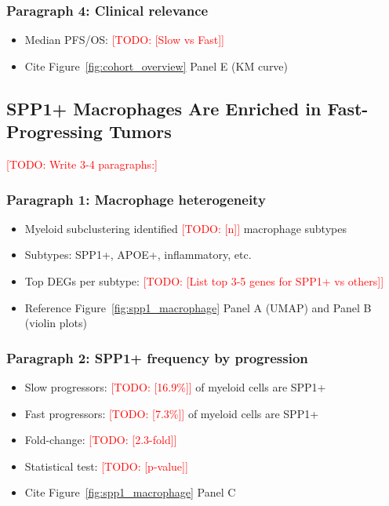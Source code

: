 \documentclass[12pt,oneside]{article}
\newcommand{\TODO}[1]{\textcolor{red}{[TODO: #1]}}
\newcommand{\FIG}[1]{Figure~\ref{fig:#1}}
\begin{document}
\subsubsection*{Paragraph 4: Clinical relevance}
\begin{itemize}
    \item Median PFS/OS: \TODO{[Slow vs Fast]}
    \item Cite \FIG{cohort_overview} Panel E (KM curve)
\end{itemize}

\subsection{SPP1+ Macrophages Are Enriched in Fast-Progressing Tumors}
\TODO{Write 3-4 paragraphs:}

\subsubsection*{Paragraph 1: Macrophage heterogeneity}
\begin{itemize}
    \item Myeloid subclustering identified \TODO{[n]} macrophage subtypes
    \item Subtypes: SPP1+, APOE+, inflammatory, etc.
    \item Top DEGs per subtype: \TODO{[List top 3-5 genes for SPP1+ vs others]}
    \item Reference \FIG{spp1_macrophage} Panel A (UMAP) and Panel B (violin plots)
\end{itemize}

\subsubsection*{Paragraph 2: SPP1+ frequency by progression}
\begin{itemize}
    \item Slow progressors: \TODO{[16.9\%]} of myeloid cells are SPP1+
    \item Fast progressors: \TODO{[7.3\%]} of myeloid cells are SPP1+
    \item Fold-change: \TODO{[2.3-fold]}
    \item Statistical test: \TODO{[p-value]}
    \item Cite \FIG{spp1_macrophage} Panel C
\end{itemize}
\end{document}
